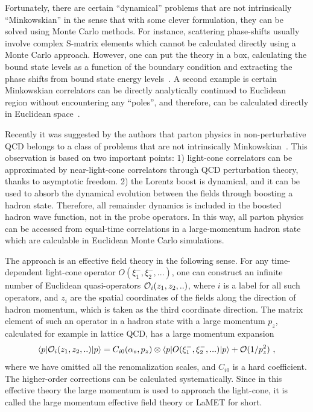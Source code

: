 Fortunately, there are certain ``dynamical'' problems that are not intrinsically ``Minkowskian'' in
the sense that with some clever formulation, they can be solved using Monte Carlo methods. For instance, scattering phase-shifts usually involve
complex S-matrix elements which cannot be calculated directly using a Monte Carlo approach.
However, one can put the theory in a box, calculating the bound state levels as a function of the boundary condition and extracting the phase shifts from bound state energy levels~\cite{Luscher:1986pf,Luscher:1990ck,Luscher:1990ux,Briceno:2017max}. A second example is certain Minkowskian correlators can be directly analytically continued to
Euclidean region without encountering any ``poles'', and therefore,
can be calculated directly in Euclidean space~\cite{Ji:2001wha}.

Recently it was suggested by the authors that parton physics in non-perturbative QCD belongs to a class
of problems that are not intrinsically Minkowskian~\cite{Ji:2013fga,Ji:2013dva,Hatta:2013gta,Xiong:2013bka,
Ji:2014gla,Ji:2014lra,Ji:2015jwa,Ji:2015qla,Xiong:2015nua}. This observation is based on two important
points: 1) light-cone correlators can be approximated by near-light-cone correlators through
QCD perturbation theory, thanks to asymptotic freedom. 2) the Lorentz boost is dynamical,
and it can be used to absorb the dynamical evolution between the fields through
boosting a hadron state. Therefore, all remainder dynamics is included in the boosted hadron wave function,
not in the probe operators. In this way, all parton physics can be accessed from equal-time correlations in a large-momentum hadron
state which are calculable in Euclidean Monte Carlo simulations.

The approach is an effective field theory in the following sense.
For any time-dependent light-cone operator $O(\xi^-_1,\xi^-_2, ...)$,
one can construct an infinite number of Euclidean quasi-operators
${\cal O}_i(z_1,z_2,..)$, where $i$ is a label for all such operators, and $z_i$ are the spatial coordinates
of the fields along the direction of hadron momentum, which is taken as the third coordinate direction.
The matrix element of such an operator in a hadron state with a large momentum $p_z$, calculated for example in lattice QCD,  has a large momentum expansion~\cite{Ji:2014gla}
\begin{equation} \label{eq:fact}
\langle p|{\cal O}_i(z_1,z_2,..)|p\rangle
= C_{i0}(\alpha_s,p_z)\otimes\langle p|O(\xi^-_1,\xi^-_2, ...)|p\rangle + {\cal O}(1/p^2_z)\ ,
\end{equation}
where we have omitted all the renomalization scales, and $C_{i0}$ is a hard coefficient. The higher-order
corrections can be calculated systematically.
Since in this effective theory the large momentum is used to approach the light-cone, it is called the large momentum effective field theory
or LaMET for short.

